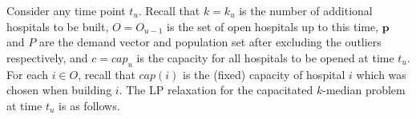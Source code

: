 


Consider any time point $t_u$. Recall that $k = k_u$ is the number of additional hospitals to be built, $O = O_{u-1}$ is the set of open hospitals up to this time, $\mathbf{p}$ and $P$ are the demand vector and population set after excluding the outliers respectively, and $c = cap_u$ is the capacity for all hospitals to be opened at time $t_u$. For each $i \in O$, recall that $cap(i)$ is the (fixed) capacity of hospital $i$ which was chosen when building $i$. The LP relaxation for the capacitated $k$-median problem at time $t_u$ is as follows.

